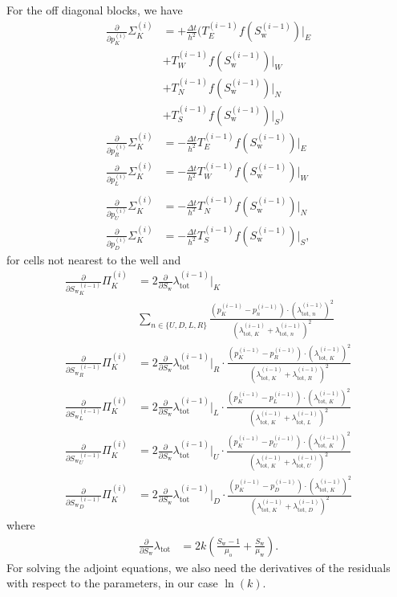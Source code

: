 \documentclass[twoside]{IEEEtran}
\newcommand*{\pdiff}[2]{\ensuremath{\frac{\partial}{\partial{#2}}{#1}}}
\begin{document}
For the off diagonal blocks, we have
\begin{align}
\pdiff{\Sigma_K^{(i)}}{p_K^{(i)}} &= +\frac{\Delta t}{h^2} \biggr(T_E^{(i-1)} f(S_\text{w}^{(i-1)})\lvert_E \\&+ T_W^{(i-1)} f(S_\text{w}^{(i-1)})\lvert_W \nonumber\\&+ T_N^{(i-1)} f(S_\text{w}^{(i-1)})\lvert_N \nonumber\\&+T_S^{(i-1)}  f(S_\text{w}^{(i-1)})\lvert_S\biggr) \nonumber\\
\pdiff{\Sigma_K^{(i)}}{p_R^{(i)}} &= -\frac{\Delta t}{h^2}T_E^{(i-1)} f(S_\text{w}^{(i-1)})\lvert_E \\
\pdiff{\Sigma_K^{(i)}}{p_L^{(i)}} &= -\frac{\Delta t}{h^2}T_W^{(i-1)} f(S_\text{w}^{(i-1)})\lvert_W \\\\
\pdiff{\Sigma_K^{(i)}}{p_U^{(i)}} &= -\frac{\Delta t}{h^2}T_N^{(i-1)} f(S_\text{w}^{(i-1)})\lvert_N \\
\pdiff{\Sigma_K^{(i)}}{p_D^{(i)}} &= -\frac{\Delta t}{h^2}T_S^{(i-1)} f(S_\text{w}^{(i-1)})\lvert_S,
\end{align}
for cells not nearest to the well and
\begin{align}
\pdiff{\Pi_K^{(i)}}{{S_\text{w}}_K^{(i-1)}} &= 2 \pdiff{\lambda_\text{tot}^{(i-1)}}{S_\text{w}}\lvert_K\\&\sum_{n\in\{U, D, L, R\}} \frac{(p_K^{(i-1)} - p_n^{(i-1)}) \cdot (\lambda_{\text{tot, }n}^{(i-1)})^2}{(\lambda_{\text{tot, }K}^{(i-1)} + \lambda_{\text{tot, }n}^{(i-1)})^2} \nonumber\\
\pdiff{\Pi_K^{(i)}}{{S_\text{w}}_R^{(i-1)}} &= 2 \pdiff{\lambda_\text{tot}^{(i-1)}}{S_\text{w}}\lvert_R \cdot
\frac{(p_K^{(i-1)} - p_R^{(i-1)}) \cdot (\lambda_{\text{tot, }K}^{(i-1)})^2}{(\lambda_{\text{tot, }K}^{(i-1)} + \lambda_{\text{tot, }R}^{(i-1)})^2} \\
\pdiff{\Pi_K^{(i)}}{{S_\text{w}}_L^{(i-1)}} &= 2 \pdiff{\lambda_\text{tot}^{(i-1)}}{S_\text{w}}\lvert_L \cdot
\frac{(p_K^{(i-1)} - p_L^{(i-1)}) \cdot (\lambda_{\text{tot, }K}^{(i-1)})^2}{(\lambda_{\text{tot, }K}^{(i-1)} + \lambda_{\text{tot, }L}^{(i-1)})^2} \\
\pdiff{\Pi_K^{(i)}}{{S_\text{w}}_U^{(i-1)}} &= 2 \pdiff{\lambda_\text{tot}^{(i-1)}}{S_\text{w}}\lvert_U \cdot
\frac{(p_K^{(i-1)} - p_U^{(i-1)}) \cdot (\lambda_{\text{tot, }K}^{(i-1)})^2}{(\lambda_{\text{tot, }K}^{(i-1)} + \lambda_{\text{tot, }U}^{(i-1)})^2} \\
\pdiff{\Pi_K^{(i)}}{{S_\text{w}}_D^{(i-1)}} &= 2 \pdiff{\lambda_\text{tot}^{(i-1)}}{S_\text{w}}\lvert_D \cdot
\frac{(p_K^{(i-1)} - p_D^{(i-1)}) \cdot (\lambda_{\text{tot, }K}^{(i-1)})^2}{(\lambda_{\text{tot, }K}^{(i-1)} + \lambda_{\text{tot, }D}^{(i-1)})^2}
\end{align}
where
\begin{align}
\pdiff{\lambda_\text{tot}}{S_\text{w}} &= 2k\left(\frac{S_\text{w} - 1}{\mu_\text{o}} + \frac{S_\text{w}}{\mu_\text{w}}\right).
\end{align}
\newpage
For solving the adjoint equations, we also need the derivatives of the residuals with respect to the parameters, in our case $\ln(k).$
\end{document}
